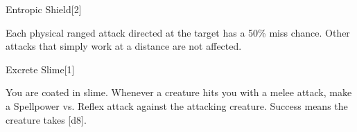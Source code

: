 \begin{spellsection}{Entropic Shield}[2]
    \begin{spellheader}
    \end{spellheader}
    \begin{spellcontent}
        \begin{spelltargetinginfo}
        \end{spelltargetinginfo}
        \begin{spelleffects}
            \spelleffect Each physical ranged attack directed at the target has a 50\% miss chance. Other attacks that simply work at a distance are not affected.
            \spelldur \durshort \dismissable
        \end{spelleffects}
    \end{spellcontent}
    \begin{spellfooter}
        \miscastrandom
    \end{spellfooter}
    \begin{spellaugments}
    \end{spellaugments}
\end{spellsection}

\begin{spellsection}{Excrete Slime}[1]
    \begin{spellheader}
    \end{spellheader}
    \begin{spellcontent}
        \begin{spelltargetinginfo}
        \end{spelltargetinginfo}
        \begin{spelleffects}
            \spelleffect You are coated in slime. Whenever a creature hits you with a melee attack, make a Spellpower vs. Reflex attack against the attacking creature. Success means the creature takes [d8].
            \spelldur \durshort
        \end{spelleffects}
    \end{spellcontent}
    \begin{spellfooter}
        \miscastexplode
    \end{spellfooter}
    \begin{spellaugments}
    \end{spellaugments}
\end{spellsection}

